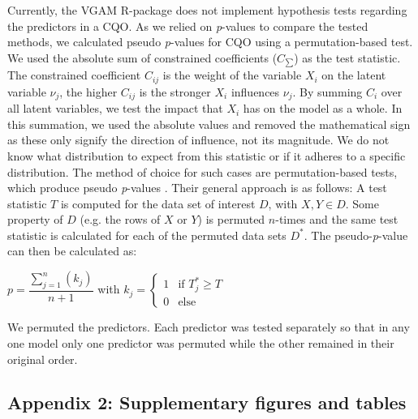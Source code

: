 \documentclass[a4paper,11pt]{article}
\begin{document}
    Currently, the VGAM R-package \citep[Version 1.1-1,][]{VGAM19} does not implement hypothesis tests regarding the predictors in a CQO. 
    As we relied on \textit{p}-values to compare the tested methods, we calculated pseudo \textit{p}-values for CQO using a permutation-based test. 
    We used the absolute sum of constrained coefficients ($ C_{\sum} $) as the test statistic.
    The constrained coefficient $C_{ij}$ is the weight of the variable $X_i$ on the latent variable $\nu_j$, the higher $C_{ij}$ is the stronger $X_i$ influences $\nu_j$. 
    By summing $C_{i}$ over all latent variables, we test the impact that $X_i$ has on the model as a whole. 
    In this summation, we used the absolute values and removed the mathematical sign as these only signify the direction of influence, not its magnitude. 
    We do not know what distribution to expect from this statistic or if it adheres to a specific distribution. 
    The method of choice for such cases are permutation-based tests, which produce pseudo \textit{p}-values \citep{legendre2012numerical}. 
    Their general approach is as follows: 
    A test statistic $T$ is computed for the data set of interest $D$, with $X,Y \in D$. 
    Some property of $D$ (e.g. the rows of $X$ or $Y$) is permuted $n$-times and the same test statistic is calculated for each of the permuted data sets $D^*$. 
    The pseudo-\textit{p}-value can then be calculated as: 
    \begin{center} 
    $p = \displaystyle \dfrac{\sum_{j=1}^n(k_j)}{n + 1}$ \hspace{1cm} 
    with 
    \hspace{1cm} $k_j = \begin{cases} 1 &\text{if\ $T^*_j \ge T$} \\ 0 & \text{else} \end{cases}$\\ 
    \end{center}

    We permuted the predictors. 
    Each predictor was tested separately so that in any one model only one predictor was permuted while the other remained in their original order. 

\subsection*{Appendix 2: Supplementary figures and tables}   
		
\end{document}
